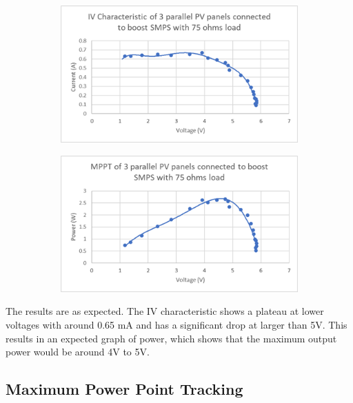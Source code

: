 \begin{figure}
    \centering
    \begin{subfigure}[b]{.45\linewidth}
        \includegraphics[width=\linewidth]{images/iv-3-load.png}
    \end{subfigure}
    \begin{subfigure}[b]{.45\linewidth}
        \includegraphics[width=\linewidth]{images/mppt-3-load.png}
    \end{subfigure}
    \caption{}
    \label{fig:mppt-load}
\end{figure}

The results are as expected. The IV characteristic shows a plateau at lower voltages with around 0.65 mA and has a significant drop at larger than 5V. This results in an expected graph of power, which shows that the maximum output power would be around 4V to 5V.

\newpage
\subsection{Maximum Power Point Tracking}

